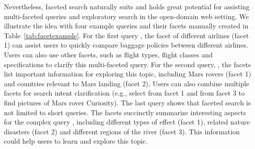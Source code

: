 Nevertheless, faceted search naturally suits and holds great potential for assisting multi-faceted queries and exploratory search in the open-domain web setting. We illustrate the idea with four example queries and their facets manually created in Table~\ref{tab:facetexample}. For the first query , the facet of different airlines (facet 1) can assist users to quickly compare baggage policies between different airlines. Users can also use other facets, such as flight types, flight classes and specifications to clarify this multi-faceted query. 
For the second query, , the facets list important information for exploring this topic, including Mars rovers (facet 1) and countries relevant to Mars landing (facet 2). Users can also combine multiple facets for search intent  clarification (e.g., select  from facet 1 and  from facet 3 to find pictures of Mars rover Curiosity). The last query shows that faceted search is not limited to short queries. The facets succinctly summarize interesting aspects for the complex query , including  different types of effect (facet 1), related nature disasters (facet 2) and different regions of the river (facet 3). This information could help users to learn and explore this topic.
